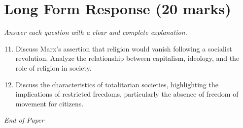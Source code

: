 \documentclass[12pt]{article}
\begin{document}
\section*{Long Form Response (20 marks)}
\textit{Answer each question with a clear and complete explanation.}
\begin{enumerate}[label=\arabic*.]
\setcounter{enumi}{10}
\item Discuss Marx's assertion that religion would vanish following a socialist revolution. Analyze the relationship between capitalism, ideology, and the role of religion in society.
\item Discuss the characteristics of totalitarian societies, highlighting the implications of restricted freedoms, particularly the absence of freedom of movement for citizens.
\end{enumerate}

\vfill
\noindent\textit{End of Paper}
\end{document}
